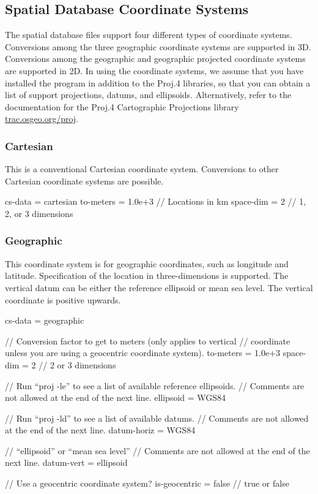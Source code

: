 \subsection{Spatial Database Coordinate Systems}

The spatial database files support four different types of coordinate
systems. Conversions among the three geographic coordinate systems
are supported in 3D. Conversions among the geographic and geographic
projected coordinate systems are supported in 2D. In using the coordinate
systems, we assume that you have installed the  program
in addition to the Proj.4 libraries, so that you can obtain a list
of support projections, datums, and ellipsoids. Alternatively, refer
to the documentation for the Proj.4 Cartographic Projections library
\url{trac.osgeo.org/proj}.

\subsubsection{Cartesian}

This is a conventional Cartesian coordinate system. Conversions to
other Cartesian coordinate systems are possible.
\begin{SimpleIOAscii}
cs-data = cartesian {
  to-meters = 1.0e+3 // Locations in km
  space-dim = 2 // 1, 2, or 3 dimensions
}
\end{SimpleIOAscii}

\subsubsection{Geographic}

This coordinate system is for geographic coordinates, such as longitude
and latitude. Specification of the location in three-dimensions is
supported. The vertical datum can be either the reference ellipsoid
or mean sea level. The vertical coordinate is positive upwards.
\begin{SimpleIOAscii}
cs-data = geographic {
  // Conversion factor to get to meters (only applies to vertical 
  // coordinate unless you are using a geocentric coordinate system).
  to-meters = 1.0e+3
  space-dim = 2 // 2 or 3 dimensions

  // Run ``proj -le'' to see a list of available reference ellipsoids.
  // Comments are not allowed at the end of the next line.
  ellipsoid = WGS84

  // Run ``proj -ld'' to see a list of available datums.
  // Comments are not allowed at the end of the next line.
  datum-horiz = WGS84

  // ``ellipsoid'' or ``mean sea level''
  // Comments are not allowed at the end of the next line.
  datum-vert = ellipsoid

  // Use a geocentric coordinate system?
  is-geocentric = false // true or false
}
\end{SimpleIOAscii}

